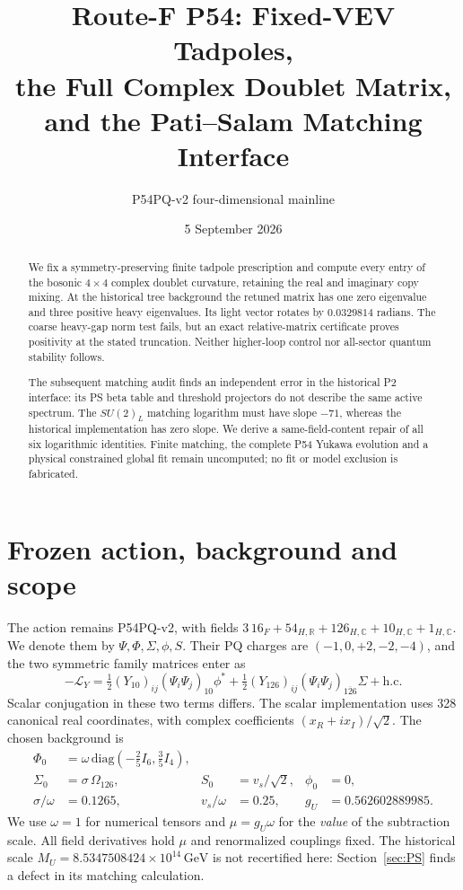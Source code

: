 \documentclass[11pt]{article}
\title{Route-F P54: Fixed-VEV Tadpoles,\\the Full Complex Doublet Matrix,\\and the Pati--Salam Matching Interface}
\author{P54PQ-v2 four-dimensional mainline}
\date{5 September 2026}
\begin{document}
\maketitle
\begin{abstract}
We fix a symmetry-preserving finite tadpole prescription and compute every
entry of the bosonic $4\times4$ complex doublet curvature, retaining the
real and imaginary copy mixing. At the historical tree background the
retuned matrix has one zero eigenvalue and three positive heavy
eigenvalues. Its light vector rotates by $0.0329814$ radians. The coarse
heavy-gap norm test fails, but an exact relative-matrix certificate proves
positivity at the stated truncation. Neither higher-loop control nor
all-sector quantum stability follows.

The subsequent matching audit finds an independent error in the historical
P2 interface: its PS beta table and threshold projectors do not describe
the same active spectrum. The $SU(2)_L$ matching logarithm must have slope
$-71$, whereas the historical implementation has zero slope. We derive a
same-field-content repair of all six logarithmic identities. Finite
matching, the complete P54 Yukawa evolution and a physical constrained
global fit remain uncomputed; no fit or model exclusion is fabricated.
\end{abstract}
\tableofcontents
\clearpage

\section{Frozen action, background and scope}
The action remains P54PQ-v2, with fields
$3\,16_F+54_{H,\mathbb R}+126_{H,\mathbb C}+10_{H,\mathbb C}+1_{H,\mathbb C}$.
We denote them by $\Psi,\Phi,\Sigma,\phi,S$. Their PQ charges are
$(-1,0,+2,-2,-4)$, and the two symmetric family matrices enter as
\begin{equation}
-\mathcal L_Y=\tfrac12 (Y_{10})_{ij}(\Psi_i\Psi_j)_{10}\phi^*
+\tfrac12 (Y_{126})_{ij}(\Psi_i\Psi_j)_{\overline{126}}\Sigma+\mathrm{h.c.}
\label{eq:Yukawa}
\end{equation}
Scalar conjugation in these two terms differs. The scalar implementation
uses 328 canonical real coordinates, with complex coefficients
$(x_R+i x_I)/\sqrt2$. The chosen background is
\begin{align}
\Phi_0&=\omega\,\mathrm{diag}(-\tfrac25 I_6,\tfrac35 I_4),\\
\Sigma_0&=\sigma\,\Omega_{126},& S_0&=v_s/\sqrt2, &\phi_0&=0,\\
\sigma/\omega&=0.1265,&v_s/\omega&=0.25,&g_U&=0.562602889985.
\end{align}
We use $\omega=1$ for numerical tensors and $\mu=g_U\omega$ for the
\emph{value} of the subtraction scale. All field derivatives hold $\mu$
and renormalized couplings fixed. The historical scale
$M_U=8.5347508424\times10^{14}\,\mathrm{GeV}$ is not recertified here:
Section~\ref{sec:PS} finds a defect in its matching calculation.
\end{document}
